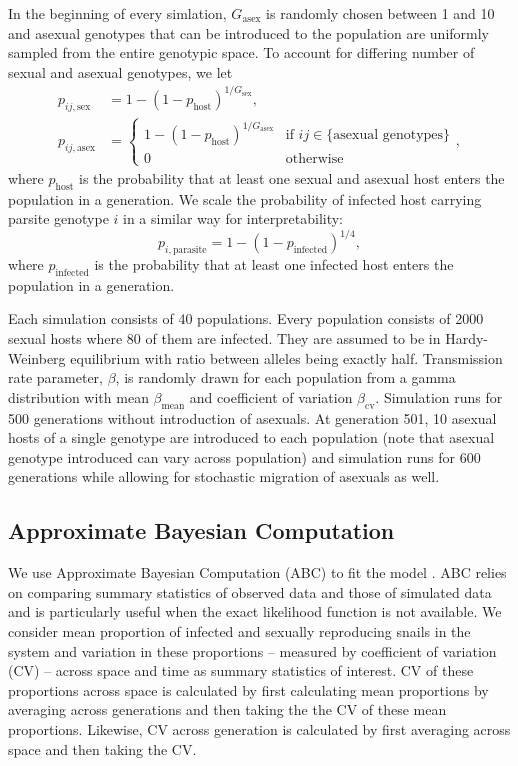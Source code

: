 \documentclass{article}\usepackage[]{graphicx}\usepackage[]{color}
\begin{document}
In the beginning of every simlation, $G_{\textrm{asex}}$ is randomly chosen between 1 and 10 and asexual genotypes that can be introduced to the population are uniformly sampled from the entire genotypic space.
To account for differing number of sexual and asexual genotypes, we let 
\begin{equation}
\begin{aligned}
p_{ij, \textrm{sex}} &= 1-(1-p_{\textrm{host}})^{1/G_\textrm{sex}},\\
p_{ij, \textrm{asex}} &=
\begin{cases}
1-(1-p_{\textrm{host}})^{1/G_\textrm{asex}} & \text{if } ij \in \{\text{asexual genotypes}\} \\
0 & \text{otherwise}
\end{cases},
\end{aligned}
\end{equation}
where $p_{\textrm{host}}$ is the probability that at least one sexual and asexual host enters the population in a generation. We scale the probability of infected host carrying parsite genotype $i$ in a similar way for interpretability:
\begin{equation}
p_{i, \textrm{parasite}} = 1 - (1-p_{\textrm{infected}})^{1/4},
\end{equation}
where $p_{\textrm{infected}}$ is the probability that at least one infected host enters the population in a generation.

Each simulation consists of 40 populations. Every population consists of 2000 sexual hosts where 80 of them are infected. They are assumed to be in Hardy-Weinberg equilibrium with ratio between alleles being exactly half. Transmission rate parameter, $\beta$, is randomly drawn for each population from a gamma distribution with mean $\beta_{\textrm{mean}}$ and coefficient of variation $\beta_{\textrm{cv}}$. Simulation runs for 500 generations without introduction of asexuals. At generation 501, 10 asexual hosts of a single genotype are introduced to each population (note that asexual genotype introduced can vary across population) and simulation runs for 600 generations while allowing for stochastic migration of asexuals as well.

\subsection{Approximate Bayesian Computation}

We use Approximate Bayesian Computation (ABC) to fit the model \citep{toni2009approximate}.
ABC relies on comparing summary statistics of observed data and those of simulated data and is particularly useful when the exact likelihood function is not available.
We consider mean proportion of infected and sexually reproducing snails in the system and variation in these proportions -- measured by coefficient of variation (CV) -- across space and time as summary statistics of interest.
CV of these proportions across space is calculated by first calculating mean proportions by averaging across generations and then taking the the CV of these mean proportions.
Likewise, CV across generation is calculated by first averaging across space and then taking the CV.
\end{document}
